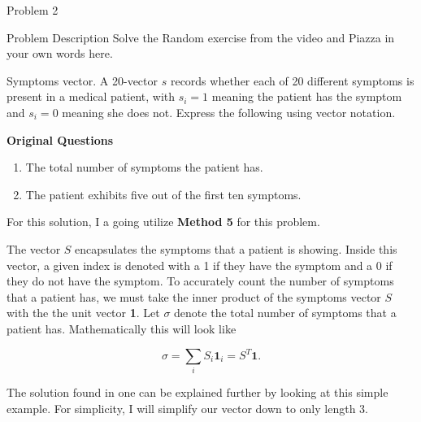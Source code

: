 \begin{problem}{Problem 2}
    \begin{statement}{Problem Description}
        Solve the Random exercise from the video and Piazza in your own words here. \vspace*{1em}

        Symptoms vector. A 20-vector $s$ records whether each of 20 different symptoms is present in a medical patient, with $s_i = 1$ meaning the patient has the symptom and $s_i = 0$ meaning she does not. Express the following 
        using vector notation. \vspace*{1em}

        \textbf{Original Questions}

        \begin{enumerate}[label=(\alph*)]
            \item The total number of symptoms the patient has.
            \item The patient exhibits five out of the first ten symptoms.
        \end{enumerate}
    \end{statement}

    \begin{Highlight}
        For this solution, I a going utilize \textbf{Method 5} for this problem. \vspace*{1em}

        The vector $S$ encapsulates the symptoms that a patient is showing. Inside this vector, a given index is denoted with a 1 if they have the symptom and a 0 if they do not have the symptom. To accurately count the number of
        symptoms that a patient has, we must take the inner product of the symptoms vector $S$ with the the unit vector \textbf{1}. Let $\sigma$ denote the total number of symptoms that a patient has. Mathematically this will look like

        \setcounter{equation}{0}
        \begin{equation}
            \sigma = \sum_{i} S_{i}\mathbf{1}_{i} = S^{T}\mathbf{1}.
        \end{equation}

        The solution found in one can be explained further by looking at this simple example. For simplicity, I will simplify our vector down to only length 3.


\end{Highlight}
\end{problem}

